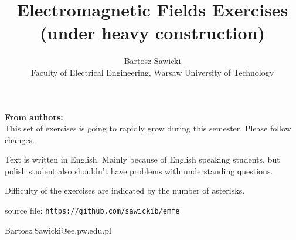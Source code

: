 \documentclass[10pt,a4paper]{article}
\title{Electromagnetic Fields Exercises\\ \vspace{0.5cm} \large{(under heavy construction)}}
\author{Bartosz Sawicki \\ \small{Faculty of Electrical Engineering, Warsaw University of Technology}}
\begin{document}
\maketitle

\noindent\textbf{From authors:}\\
This set of exercises is going to rapidly grow during this semester. Please follow changes. 

Text is written in English. Mainly because of English speaking students, but polish student also shouldn’t have problems with understanding questions.

Difficulty of the exercises are indicated by the number of asterisks. 

source file: \verb+https://github.com/sawickib/emfe+

\vspace{0.3cm}
\begin{flushright}
Bartosz.Sawicki@ee.pw.edu.pl
\end{flushright}

\tableofcontents



\end{document}
